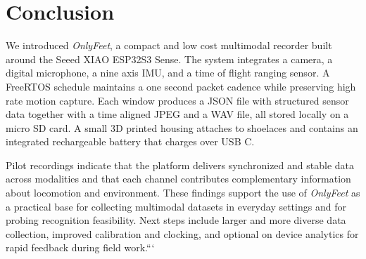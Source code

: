 \documentclass[manuscript,review,anonymous]{acmart}
\begin{document}
\section{Conclusion}

We introduced \textit{OnlyFeet}, a compact and low cost multimodal recorder built around the Seeed XIAO ESP32S3 Sense. The system integrates a camera, a digital microphone, a nine axis IMU, and a time of flight ranging sensor. A FreeRTOS schedule maintains a one second packet cadence while preserving high rate motion capture. Each window produces a JSON file with structured sensor data together with a time aligned JPEG and a WAV file, all stored locally on a micro SD card. A small 3D printed housing attaches to shoelaces and contains an integrated rechargeable battery that charges over USB C. 

Pilot recordings indicate that the platform delivers synchronized and stable data across modalities and that each channel contributes complementary information about locomotion and environment. These findings support the use of \textit{OnlyFeet} as a practical base for collecting multimodal datasets in everyday settings and for probing recognition feasibility. Next steps include larger and more diverse data collection, improved calibration and clocking, and optional on device analytics for rapid feedback during field work.```


\begin{acks}
\end{acks}



\end{document}
